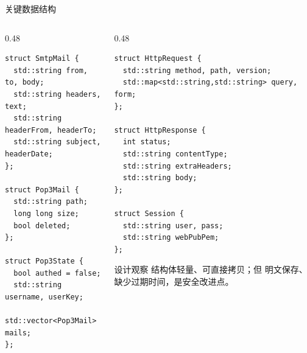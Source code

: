 \documentclass[aspectratio=169,10pt]{beamer}
\newcommand{\code}[1]{\texttt{\small\detokenize{#1}}}
\begin{document}
\begin{frame}[fragile]{关键数据结构}
  \begin{columns}[T]
    \begin{column}{0.48\textwidth}
      \begin{lstlisting}[style=cppstyle,basicstyle=\ttfamily\tiny]
struct SmtpMail {
  std::string from, to, body;
  std::string headers, text;
  std::string headerFrom, headerTo;
  std::string subject, headerDate;
};

struct Pop3Mail {
  std::string path;
  long long size;
  bool deleted;
};

struct Pop3State {
  bool authed = false;
  std::string username, userKey;
  std::vector<Pop3Mail> mails;
};
      \end{lstlisting}
    \end{column}
    \begin{column}{0.48\textwidth}
      \begin{lstlisting}[style=cppstyle,basicstyle=\ttfamily\tiny]
struct HttpRequest {
  std::string method, path, version;
  std::map<std::string,std::string> query, form;
};

struct HttpResponse {
  int status;
  std::string contentType;
  std::string extraHeaders;
  std::string body;
};

struct Session {
  std::string user, pass;
  std::string webPubPem;
};
      \end{lstlisting}
      \begin{block}{设计观察}
        \small
        结构体轻量、可直接拷贝；但 \code{Session.pass} 明文保存、缺少过期时间，是安全改进点。
      \end{block}
    \end{column}
  \end{columns}
\end{frame}
\end{document}
